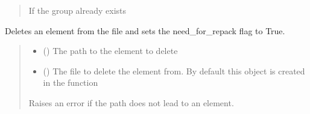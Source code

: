 \documentclass[letterpaper,10pt,english]{sphinxmanual}
\begin{document}
\begin{fulllineitems}
\begin{fulllineitems}
\begin{quote}
\begin{description}
\begin{itemize}
\end{itemize}

\sphinxAtStartPar
{\hyperref[\detokenize{source/_autosummary/HDF5_BLS.errors:HDF5_BLS.errors.WrapperError}]{}} \textendash{} If the group already exists

\end{description}\end{quote}

\end{fulllineitems}


\begin{fulllineitems}
\label{\detokenize{source/_autosummary/HDF5_BLS.Wrapper:HDF5_BLS.Wrapper.delete_element}}
\pysigstartsignatures
\pysiglinewithargsret
{}
{\sphinxparamcomma {}}
{}
\pysigstopsignatures
\sphinxAtStartPar
Deletes an element from the file and sets the need\_for\_repack flag to True.
\begin{quote}\begin{description}
\begin{itemize}
\item {} 
\sphinxAtStartPar
{} () \textendash{} The path to the element to delete

\item {} 
\sphinxAtStartPar
{} () \textendash{} The file to delete the element from. By default this object is created in the function

\end{itemize}

\sphinxAtStartPar
{\hyperref[\detokenize{source/_autosummary/HDF5_BLS.errors:HDF5_BLS.errors.WrapperError}]{}} \textendash{} Raises an error if the path does not lead to an element.

\end{description}\end{quote}


\end{fulllineitems}
\end{fulllineitems}
\end{document}
